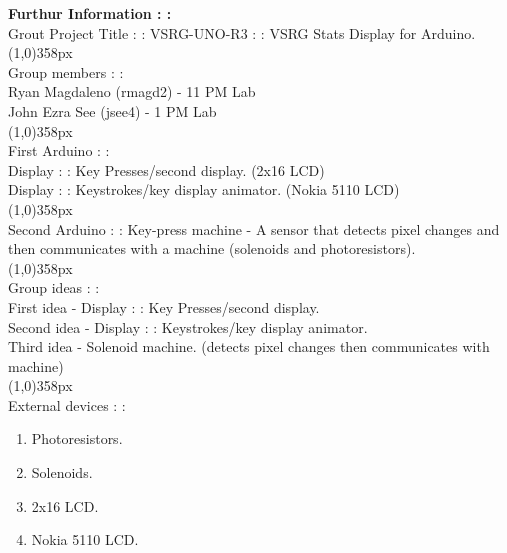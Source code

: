 \documentclass[11pt]{article}
\begin{document}
\textbf{Furthur Information : :} \\
Grout Project Title : : VSRG-UNO-R3 : :  VSRG Stats Display for Arduino. \\
\vspace{10px}\line(1,0){358px} \\Group members : : \\
Ryan Magdaleno (rmagd2) - 11 PM Lab \\
John Ezra See (jsee4) - 1 PM Lab \\
\vspace{10px}\line(1,0){358px} \\First Arduino : : \\
Display : : Key Presses/second display. (2x16 LCD) \\
Display : : Keystrokes/key display animator. (Nokia 5110 LCD) \\
\vspace{10px}\line(1,0){358px} \\Second Arduino : :
Key-press machine - A sensor that detects pixel changes and then communicates 
with a machine (solenoids and photoresistors). \\
\vspace{10px}\line(1,0){358px} \\Group ideas : : \\
First idea - Display : :  Key Presses/second display. \\
Second idea -  Display : : Keystrokes/key display animator. \\
Third idea - Solenoid machine. (detects pixel changes then communicates with
machine) \\
\vspace{10px}\line(1,0){358px} \\External devices : :
\begin{enumerate}
\item Photoresistors.
\item Solenoids.
\item 2x16 LCD.
\item Nokia 5110 LCD.
\end{enumerate}
\end{document}
